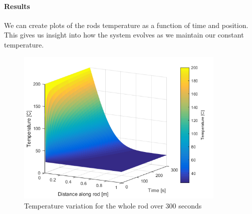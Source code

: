  \paragraph{Results}
\noindent We can create plots of the rods temperature as a function of time and position. This gives us insight into how the system evolves as we maintain our constant temperature. 
\begin{figure}[htb]
	\centering
	\includegraphics[width=10cm]{Figures/Heat1D_1m.png}       
	\caption{Temperature variation for the whole rod over 300 seconds}
	\label{fig:toto}
\end{figure}

